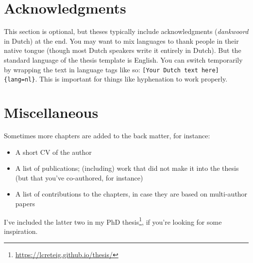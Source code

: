 \documentclass[12pt,english,a4paper,oneside,]{book} %
\newcommand{\textdutch}[2][]{\foreignlanguage{dutch}{#2}}
\renewcommand{\href}[2]{#2\footnote{\url{#1}}}
\providecommand{\tightlist}{%
  \setlength{\itemsep}{0pt}\setlength{\parskip}{0pt}}
\let\rmarkdownfootnote\footnote%
\def\footnote{\protect\rmarkdownfootnote}
\theoremstyle{definition}
\theoremstyle{definition}
\theoremstyle{definition}
\theoremstyle{remark}
\begin{document}
\hypertarget{acknowledgments}{%
\chapter*{Acknowledgments}\label{acknowledgments}}


This section is optional, but theses typically include acknowledgments (\textdutch{\emph{dankwoord}} in Dutch) at the end. You may want to mix languages to thank people in their native tongue (though most Dutch speakers write it entirely in Dutch). But the standard language of the thesis template is English. You can switch temporarily by wrapping the text in language tags like so: \texttt{{[}Your\ Dutch\ text\ here{]}\{lang=nl\}}. This is important for things like hyphenation to work properly.

\hypertarget{miscellaneous}{%
\chapter*{Miscellaneous}\label{miscellaneous}}


Sometimes more chapters are added to the back matter, for instance:

\begin{itemize}
\tightlist
\item
  A short CV of the author
\item
  A list of publications; (including) work that did not make it into the thesis (but that you've co-authored, for instance)
\item
  A list of contributions to the chapters, in case they are based on multi-author papers
\end{itemize}

I've included the latter two in \href{https://lcreteig.github.io/thesis/}{my PhD thesis}, if you're looking for some inspiration.

\backmatter
\end{document}
